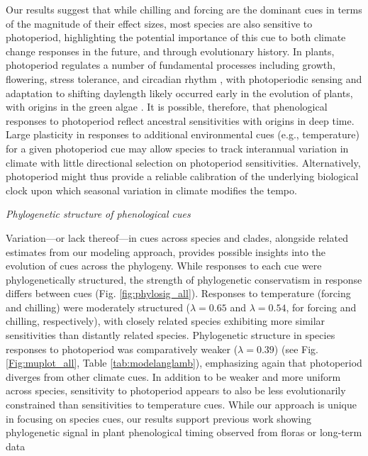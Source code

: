 \documentclass{article}\usepackage[]{graphicx}\usepackage[]{color}
\begin{document}
Our results suggest that while chilling and forcing are the dominant cues in terms of the magnitude of their effect sizes, most species are also sensitive to photoperiod, highlighting the potential importance of this cue to both climate change responses in the future, and through evolutionary history. In plants, photoperiod regulates a number of fundamental processes including growth, flowering, stress tolerance, and circadian rhythm \citep{serrano2017,Singh:2017}, with photoperiodic sensing and adaptation to shifting daylength likely occurred early in the evolution of plants, with origins in the green algae \citep{serrano2017}. It is possible, therefore, that phenological responses to photoperiod reflect ancestral sensitivities with origins in deep time. Large plasticity in responses to additional environmental cues (e.g., temperature) for a given photoperiod cue \citep[e.g.,][]{kramer1995} may allow species to track interannual variation in climate with little directional selection on photoperiod sensitivities. Alternatively, photoperiod might thus provide a reliable calibration of the underlying biological clock \citep{jackson2009plant} upon which seasonal variation in climate modifies the tempo. 

\emph{Phylogenetic structure of phenological cues}

Variation---or lack thereof---in cues across species and clades, alongside related estimates from our modeling approach, provides possible insights into the evolution of cues across the phylogeny. While responses to each cue were phylogenetically structured, the strength of phylogenetic conservatism in response differs between cues (Fig. \ref{fig:phylosig_all}). Responses to temperature (forcing and chilling) were moderately structured ($\lambda = 0.65$ and $\lambda = 0.54$, for forcing and chilling, respectively), with closely related species exhibiting more similar sensitivities than distantly related species. Phylogenetic structure in species responses to photoperiod was comparatively weaker ($\lambda= 0.39$) (see Fig. \ref{Fig:muplot_all}, Table \ref{tab:modelanglamb}), emphasizing again that photoperiod diverges from other climate cues. In addition to be weaker and more uniform across species, sensitivity to photoperiod appears to also be less evolutionarily constrained than sensitivities to temperature cues. While our approach is unique in focusing on species cues, our results support previous work showing phylogenetic signal in plant phenological timing observed from floras or long-term data \cite{kochmer1986constraints,davies2013phylogenetic} 
\end{document}
